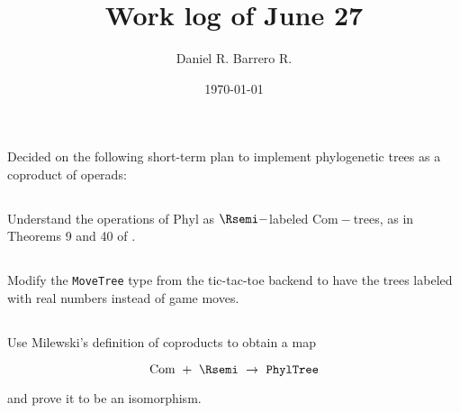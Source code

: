 \documentclass{amsart}
\title{Work log of June 27}
\author{Daniel R. Barrero R.}
\date{\today}
\begin{document}
\maketitle

\section{}

Decided on the following short-term plan to implement phylogenetic trees as a
coproduct of operads:

\subsection{} Understand the operations of $\mathrm{Phyl}$ as $\Rsemi-$labeled
$\mathrm{Com}-$trees, as in Theorems 9 and 40 of \cite{baezOtter}.

\subsection{} Modify the \texttt{MoveTree} type from the tic-tac-toe backend to
have the trees labeled with real numbers instead of game moves.

\subsection{} Use Milewski's definition of coproducts to obtain a map

\begin{equation}
	\mathrm{Com} \ + \ \Rsemi \ \to \ \mathtt{PhylTree}
\end{equation}

and prove it to be an isomorphism.



\end{document}

